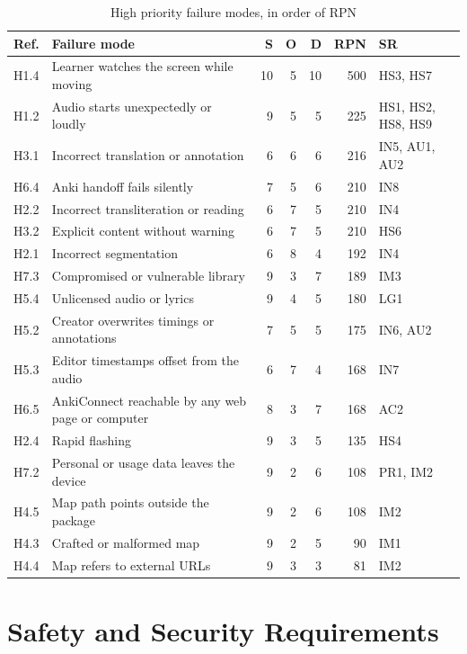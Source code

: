 \documentclass{article}
\begin{document}
\begin{table}[h!]
\caption{High priority failure modes, in order of RPN} \label{TblPriority}
\begin{tabularx}{\textwidth}{lXrrrrl}
\toprule
\textbf{Ref.} & \textbf{Failure mode} & \textbf{S} & \textbf{O} & \textbf{D} &
\textbf{RPN} & \textbf{SR}\\
\midrule
H1.4 & Learner watches the screen while moving & 10 & 5 & 10 & 500 & HS3, HS7\\
H1.2 & Audio starts unexpectedly or loudly & 9 & 5 & 5 & 225 & HS1, HS2, HS8, HS9\\
H3.1 & Incorrect translation or annotation & 6 & 6 & 6 & 216 & IN5, AU1, AU2\\
H6.4 & Anki handoff fails silently & 7 & 5 & 6 & 210 & IN8\\
H2.2 & Incorrect transliteration or reading & 6 & 7 & 5 & 210 & IN4\\
H3.2 & Explicit content without warning & 6 & 7 & 5 & 210 & HS6\\
H2.1 & Incorrect segmentation & 6 & 8 & 4 & 192 & IN4\\
H7.3 & Compromised or vulnerable library & 9 & 3 & 7 & 189 & IM3\\
H5.4 & Unlicensed audio or lyrics & 9 & 4 & 5 & 180 & LG1\\
H5.2 & Creator overwrites timings or annotations & 7 & 5 & 5 & 175 & IN6, AU2\\
H5.3 & Editor timestamps offset from the audio & 6 & 7 & 4 & 168 & IN7\\
H6.5 & AnkiConnect reachable by any web page or computer & 8 & 3 & 7 & 168 & AC2\\
H2.4 & Rapid flashing & 9 & 3 & 5 & 135 & HS4\\
H7.2 & Personal or usage data leaves the device & 9 & 2 & 6 & 108 & PR1, IM2\\
H4.5 & Map path points outside the package & 9 & 2 & 6 & 108 & IM2\\
H4.3 & Crafted or malformed map & 9 & 2 & 5 & 90 & IM1\\
H4.4 & Map refers to external URLs & 9 & 3 & 3 & 81 & IM2\\
\bottomrule
\end{tabularx}
\end{table}

\section{Safety and Security Requirements} \label{SecRequirements}
\end{document}
